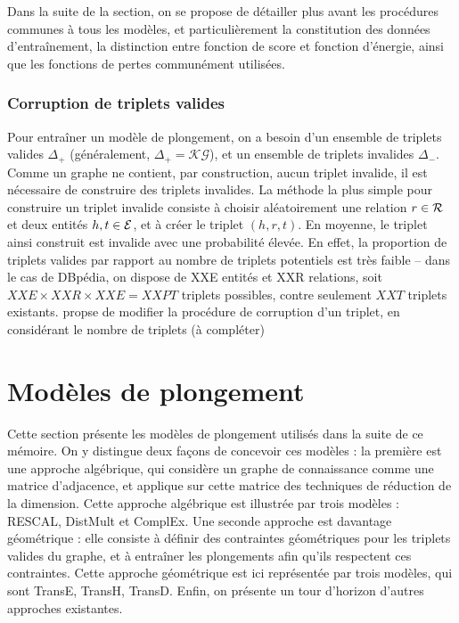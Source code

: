 Dans la suite de la section, on se propose de détailler plus avant les procédures communes à tous les modèles, et particulièrement la constitution des données d'entraînement, la distinction entre fonction de score et fonction d'énergie, ainsi que les fonctions de pertes communément utilisées. 

\subsubsection{Corruption de triplets valides}
Pour entraîner un modèle de plongement, on a besoin d'un ensemble de triplets valides $\Delta_+$ (généralement, $\Delta_+ = \mathcal{KG}$), et un ensemble de triplets invalides $\Delta_-$. Comme un graphe ne contient, par construction, aucun triplet invalide, il est nécessaire de construire des triplets invalides. La méthode la plus simple pour construire un triplet invalide consiste à choisir aléatoirement une relation $r \in \mathcal{R}$ et deux entités $h, t \in \mathcal{E}$, et à créer le triplet $(h, r, t)$. En moyenne, le triplet ainsi construit est invalide avec une probabilité élevée. En effet, la proportion de triplets valides par rapport au nombre de triplets potentiels est très faible – dans le cas de DBpédia, on dispose de XXE entités et XXR relations, soit $XXE \times XXR \times XXE = XXPT$ triplets possibles, contre seulement $XXT$ triplets existants. %
\cite{TransH} propse de modifier la procédure de corruption d'un triplet, en considérant le nombre de triplets (à compléter)




\section{Modèles de plongement}
\label{sec:kge-models}

Cette section présente les modèles de plongement utilisés dans la suite de ce mémoire. On y distingue deux façons de concevoir ces modèles : la première est une approche algébrique, qui considère un graphe de connaissance comme une matrice d'adjacence, et applique sur cette matrice des techniques de réduction de la dimension. %
Cette approche algébrique est illustrée par trois modèles : RESCAL, DistMult et ComplEx. Une seconde approche est davantage géométrique : elle consiste à définir des contraintes géométriques pour les triplets valides du graphe, et à entraîner les plongements afin qu'ils respectent ces contraintes. %
Cette approche géométrique est ici représentée par trois modèles, qui sont TransE, TransH, TransD. 
Enfin, on présente un tour d'horizon d'autres approches existantes.


